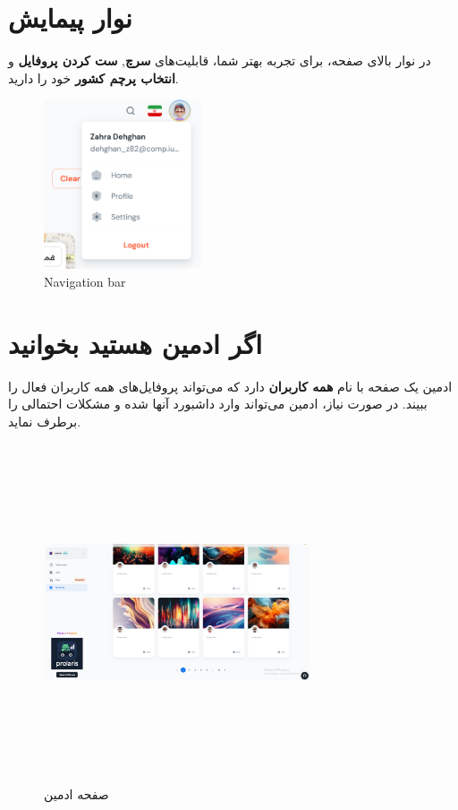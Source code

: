 \documentclass{report}
\begin{document}
\section{نوار پیمایش }
در نوار بالای صفحه، برای تجربه بهتر شما، قابلیت‌های \textbf{سرچ}, \textbf{ست کردن پروفایل} و \textbf{انتخاب پرچم کشور} خود را دارید.

\begin{figure}[ht]
	\centering
	\includegraphics[height=5cm,keepaspectratio]{Pic/nav_menu}
	\caption{Navigation bar}
	\label{fig:nav}
\end{figure}

\section{اگر ادمین هستید بخوانید}
ادمین یک صفحه با نام \textbf{همه کاربران} دارد که می‌تواند پروفایل‌های همه کاربران فعال را ببیند. در صورت نیاز، ادمین می‌تواند وارد داشبورد آنها شده و مشکلات احتمالی را برطرف نماید.

\begin{figure}[ht]
	\centering
	\includegraphics[width=0.7\textwidth,height=10cm,keepaspectratio]{Pic/admin}
	\caption{صفحه ادمین}
	\label{fig:admin}
\end{figure}
\end{document}
